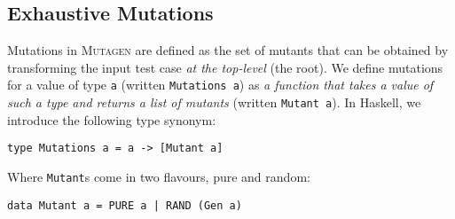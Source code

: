 \documentclass[sigconf,review,anonymous]{acmart}
\newcommand{\fuzzchick}{\textit{FuzzChick}\xspace}
\newcommand{\mutagen}{\textsc{Mutagen}\xspace}
\begin{document}



\subsection{Exhaustive Mutations}


Mutations in \mutagen are defined as the set of mutants that can be obtained by
transforming the input test case \emph{at the top-level} (the root).
%
We define mutations for a value of type \texttt{a} (written \texttt{Mutations
  a}) as \emph{a function that takes a value of such a type and returns a list of
mutants} (written \texttt{Mutant a}).
%
In Haskell, we introduce the following type synonym:
%
\begin{verbatim}
type Mutations a = a -> [Mutant a]
\end{verbatim}
%
\noindent Where \texttt{Mutant}s come in two flavours, pure and random:

\begin{verbatim}
data Mutant a = PURE a | RAND (Gen a)
\end{verbatim}
\end{document}
